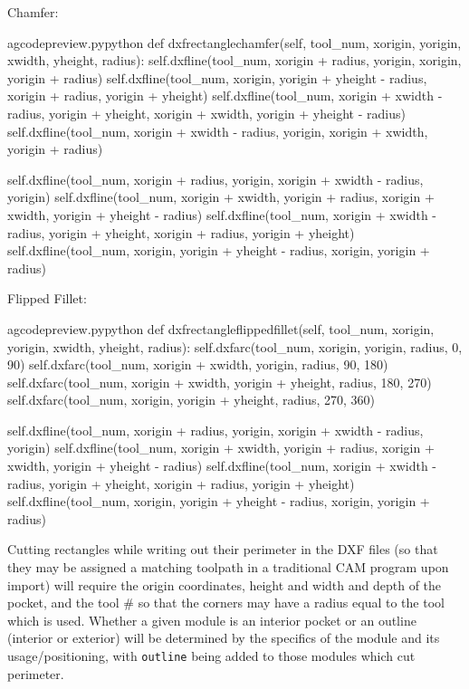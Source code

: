 \documentclass{ltxdoc}
\begin{document}
Chamfer:

\lstset{firstnumber=\thegcpy}
\begin{writecode}{a}{gcodepreview.py}{python}
    def dxfrectanglechamfer(self, tool_num, xorigin, yorigin, xwidth, yheight, radius):
        self.dxfline(tool_num, xorigin + radius, yorigin, xorigin, yorigin + radius)
        self.dxfline(tool_num, xorigin, yorigin + yheight - radius, xorigin + radius, yorigin + yheight)
        self.dxfline(tool_num, xorigin + xwidth - radius, yorigin + yheight, xorigin + xwidth, yorigin + yheight - radius)
        self.dxfline(tool_num, xorigin + xwidth - radius, yorigin, xorigin + xwidth, yorigin + radius)

        self.dxfline(tool_num, xorigin + radius, yorigin, xorigin + xwidth - radius, yorigin)
        self.dxfline(tool_num, xorigin + xwidth, yorigin + radius, xorigin + xwidth, yorigin + yheight - radius)
        self.dxfline(tool_num, xorigin + xwidth - radius, yorigin + yheight, xorigin + radius, yorigin + yheight)
        self.dxfline(tool_num, xorigin, yorigin + yheight - radius, xorigin, yorigin + radius)

\end{writecode}
\addtocounter{gcpy}{11}

Flipped Fillet:

\lstset{firstnumber=\thegcpy}
\begin{writecode}{a}{gcodepreview.py}{python}
    def dxfrectangleflippedfillet(self, tool_num, xorigin, yorigin, xwidth, yheight, radius):
        self.dxfarc(tool_num, xorigin, yorigin, radius,  0, 90)
        self.dxfarc(tool_num, xorigin + xwidth, yorigin, radius, 90, 180)
        self.dxfarc(tool_num, xorigin + xwidth, yorigin + yheight, radius, 180, 270)
        self.dxfarc(tool_num, xorigin, yorigin + yheight, radius, 270, 360)

        self.dxfline(tool_num, xorigin + radius, yorigin, xorigin + xwidth - radius, yorigin)
        self.dxfline(tool_num, xorigin + xwidth, yorigin + radius, xorigin + xwidth, yorigin + yheight - radius)
        self.dxfline(tool_num, xorigin + xwidth - radius, yorigin + yheight, xorigin + radius, yorigin + yheight)
        self.dxfline(tool_num, xorigin, yorigin + yheight - radius, xorigin, yorigin + radius)

\end{writecode}
\addtocounter{gcpy}{11}

Cutting rectangles while writing out their perimeter in the DXF files (so that they may be assigned a matching toolpath in a traditional CAM program upon import) will require the origin coordinates, height and width and depth of the pocket, and the tool \# so that the corners may have a radius equal to the tool which is used. Whether a given module is an interior pocket or an outline (interior or exterior) will be determined by the specifics of the module and its usage/positioning, with \texttt{outline} being added to those modules which cut perimeter.
\end{document}
